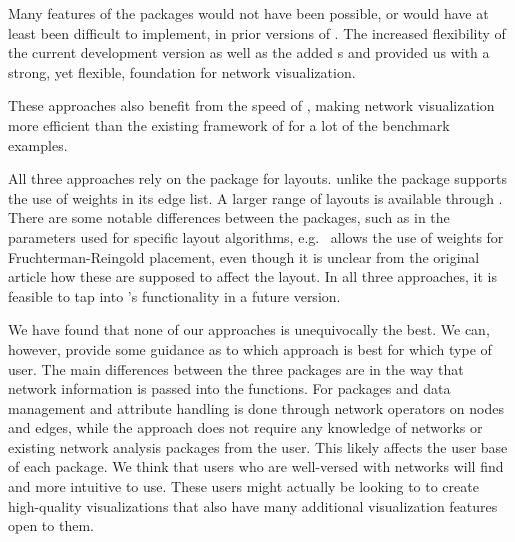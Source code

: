 Many features of the packages would not have been possible, or would have at least been difficult to implement, in  prior versions of .  The increased flexibility of the current development version as well as the added s  and  provided us with a strong, yet flexible, foundation for network visualization.

These approaches also benefit from the speed of ,  making network visualization more efficient than the existing framework of  for a lot of the benchmark examples. %

All three approaches rely on the package  for layouts.  unlike the  package supports the use of weights in its edge list.  A larger range of layouts is available through . There are some notable differences between the packages, such as in the parameters used for specific layout algorithms, e.g.\  allows the use of weights for Fruchterman-Reingold placement, even though it is unclear from the original article how these are supposed to affect the layout. In all  three approaches, it is  feasible to tap into 's functionality in a future version.



We have found that none of our approaches is unequivocally the best. We can, however, provide some guidance as to which approach is best for which type of user. 
The main differences between the three packages are in the way that network information is passed into the functions. For packages  and  data management and attribute handling is done through network operators on nodes and edges, while the  approach does not require any knowledge of networks or existing network analysis packages from the user. 
This likely affects the user base of each package. 
We think that users who are well-versed with networks will find  and  more intuitive to use. These users might actually be looking to  to create high-quality visualizations that also have many additional visualization features open to them.


